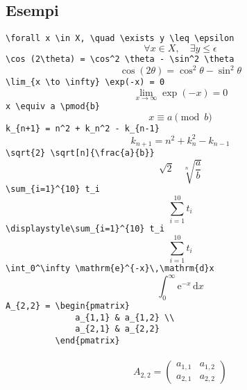 \subsection{Esempi}
\verb!\forall x \in X, \quad \exists y \leq \epsilon!\[\forall x \in X, \quad \exists y \leq \epsilon\]
  \verb!\cos (2\theta) = \cos^2 \theta - \sin^2 \theta!\[\cos (2\theta) = \cos^2 \theta - \sin^2 \theta\]
  \verb!\lim_{x \to \infty} \exp(-x) = 0! \[
  \lim_{x \to \infty} \exp(-x) = 0\]
  \verb!x \equiv a \pmod{b}! \[x \equiv a \pmod{b}\]
  \verb!k_{n+1} = n^2 + k_n^2 - k_{n-1}!\[k_{n+1} = n^2 + k_n^2 - k_{n-1}\]
  \verb!\sqrt{2} \sqrt[n]{\frac{a}{b}}! \[\sqrt2 ~~~~ \sqrt[n]{\frac{a}{b}}\]
  \verb!\sum_{i=1}^{10} t_i! \[\sum_{i=1}^{10} t_i\]
  \verb!\displaystyle\sum_{i=1}^{10} t_i! \[\displaystyle\sum_{i=1}^{10} t_i\]
  \verb!\int_0^\infty \mathrm{e}^{-x}\,\mathrm{d}x! \[\int_0^\infty \mathrm{e}^{-x}\,\mathrm{d}x\]
  \verb!A_{2,2} = \begin{pmatrix}         !\\
  \verb!              a_{1,1} & a_{1,2} \\!\\
  \verb!              a_{2,1} & a_{2,2}   !\\
  \verb!          \end{pmatrix}           !\\~\\
    \[A_{2,2} = \begin{pmatrix}a_{1,1} & a_{1,2} \\a_{2,1} & a_{2,2}\end{pmatrix}\]

